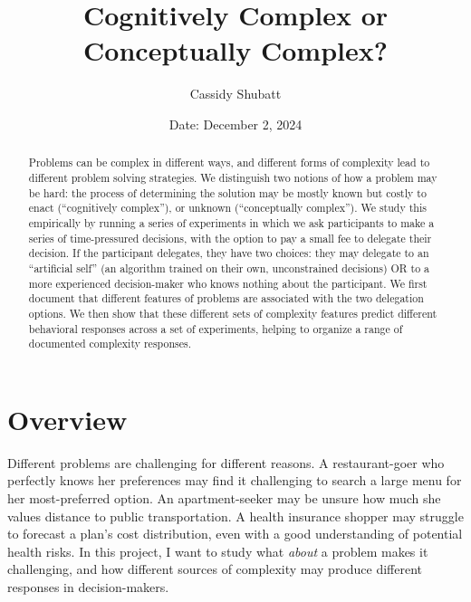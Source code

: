 \documentclass[12pt]{article}
\begin{document}
\title{Cognitively Complex or Conceptually Complex?}


\author{Cassidy Shubatt}

\date{\small{Date: December 2, 2024}}

\normalsize
\maketitle

\normalsize




\begin{abstract}
    Problems can be complex in different ways, and different forms of complexity lead to different problem solving strategies. We distinguish two notions of how a problem may be hard: the process of determining the solution may be mostly known but costly to enact (``cognitively complex''), or unknown (``conceptually complex''). We study this empirically by running a series of experiments in which we ask participants to make a series of time-pressured decisions, with the option to pay a small fee to delegate their decision. If the participant delegates, they have two choices: they may delegate to an ``artificial self'' (an algorithm trained on their own, unconstrained decisions) OR to a more experienced decision-maker who knows nothing about the participant. We first document that different features of problems are associated with the two delegation options. We then show that these different sets of complexity features predict different behavioral responses across a set of experiments, helping to organize a range of documented complexity responses. 
\end{abstract}

\section{Overview}
Different problems are challenging for different reasons. A restaurant-goer who perfectly knows her preferences may find it challenging to search a large menu for her most-preferred option. An apartment-seeker may be unsure how much she values distance to public transportation. A health insurance shopper may struggle to forecast a plan's cost distribution, even with a good understanding of potential health risks. In this project, I want to study what \textit{about} a problem makes it challenging, and how different sources of complexity may produce different responses in decision-makers.
\end{document}
